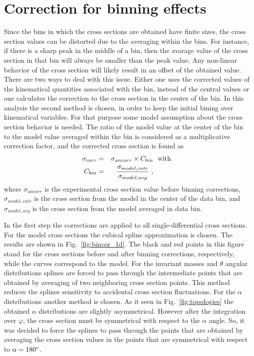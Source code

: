 \chapter{Correction for binning effects}

Since the bins in which the cross sections are obtained have finite sizes, the cross section values can be distorted due to the averaging within the bins.  For instance, if there is a sharp peak in the middle of a bin, then the avarage value of the cross section in that bin will always be smaller than the peak value. Any non-linear behavior of the cross section will likely result in an offset of the obtained
value. There are two ways to deal with this issue. Either one uses the corrected values of the kinematical quantities associated with the bin, instead of the central values or one calculates the correction to the  cross section in the center of the bin. In this analysis the second method is chosen,
in order to keep the initial bining over kinematical variables. For that purpose some model assumption about the cross section behavior is needed. The ratio of
the model value at the center of the bin  to
the model value averaged within the bin is considered as a
multiplicative correction factor, and the
corrected cross section is found as
\begin{equation}
\begin{aligned}
\sigma_{corr} & = &\sigma_{uncorr} \times
C_{bin} & \text{ \,\,with}\\
\label{eq:bincor}
C_{bin} & = &\frac{\sigma_{model,cntr}}{\sigma_{model,avg}} \textrm{ ,}
\end{aligned}  
\end{equation}
where $\sigma_{uncorr}$ is the experimental
cross section value before binning
corrections, $\sigma_{model,cntr}$ is the cross
section from the model
in the center
of the data bin, and
$\sigma_{model,avg}$ is the cross
section from the model averaged in data bin.


In the first step the corrections  are
applied to all single-differential cross
sections. For the model cross sections the cubical spline 
approximation is chosen. The results are shown in Fig.~\ref{fig:bincor_1d}. The black and red points in this figure stand for the cross sections before and after binning corrections, respectively, while the curves correspond to the model.
For the invariant masses and $\theta$ angular distributions splines are forced to pass through the intermediate points that are obtained by averaging of two neighboring cross section points. This method reduces the splines sensitivity to accidental cross section fluctuations.
For the $\alpha$ distributions another method is chosen.
As it seen in Fig.~\ref{fig:topologies} the obtained $\alpha$ distributions are slightly asymmetrical. However  after the integration over $\varphi$, the cross section must be symmetrical with respect to the $\alpha$ angle.
So, it was decided  to force the splines to pass through the points that are obtained by averaging the cross section values in the points that are symmetrical with respect to $\alpha = 180^{\rm o}$.






